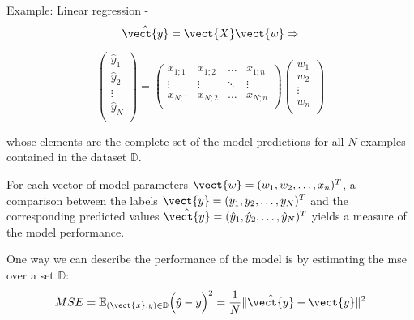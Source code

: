 \begin{frame}[t,allowframebreaks]{
    Example: Linear regression - }
    \begin{equation}
        \hat{\vect{y}} = \vect{X} \vect{w} \Rightarrow
        \label{eq:linear_regression_pred_1}
    \end{equation}

    \begin{equation}
        \begin{pmatrix}
        \hat{y}_1\\
        \hat{y}_2\\
        \vdots\\
        \hat{y}_N\\
        \end{pmatrix} =
        \begin{pmatrix}
            x_{1;1} & x_{1;2} & \dots  & x_{1;n} \\
            \vdots  & \vdots  & \ddots & \vdots  \\
            x_{N;1} & x_{N;2} & \dots  & x_{N;n} \\
        \end{pmatrix}
        \begin{pmatrix}
            w_1\\ 
            w_2\\ 
            \vdots\\
            w_n\\
        \end{pmatrix}
        \label{eq:linear_regression_pred_2}
    \end{equation}

    whose elements are the complete set of the model predictions 
    for all $N$ examples contained in the dataset $\mathbb{D}$.\\
    \vspace{0.1cm}

    For each vector of model parameters 
    $\vect{w} = (w_1, w_2, \dots, x_n)^T$,
    a comparison between the labels 
    $\vect{y} = (y_1, y_2, \dots, y_N)^{T}$
    and the corresponding predicted values 
    $\hat{\vect{y}} = (\hat{y}_1, \hat{y}_2, \dots, \hat{y}_N)^{T}$
    yields a measure of the model performance.\\

    \framebreak


    One way we can describe the 
    performance of the model is by estimating the 
    \gls{mse} over a set $\mathbb{D}$:
    \begin{equation}
        MSE = 
          \mathbb{E}_{(\vect{x},y) \in \mathbb{D}}
             \Big(\hat{y} - y\Big)^2 = 
           \frac{1}{N} 
             \lVert \hat{\vect{y}}-\vect{y} \rVert^2 
        \label{eq:intro_linear_regression_model_mse_1}
    \end{equation}


\end{frame}
